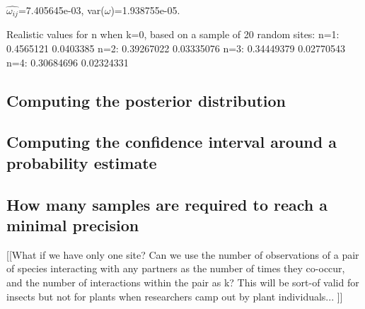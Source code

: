 \documentclass[12pt]{article}
\begin{document}
      $\hat{\omega_{ij}}$=7.405645e-03, var($\omega$)=1.938755e-05.
      

      Realistic values for n when k=0, based on a sample of 20 random sites:
      n=1: 0.4565121 0.0403385
      n=2: 0.39267022 0.03335076
      n=3: 0.34449379 0.02770543
      n=4: 0.30684696 0.02324331






    \subsection*{Computing the posterior distribution}

  \subsection*{Computing the confidence interval around a probability estimate}

    \subsection*{How many samples are required to reach a minimal precision}


  [[What if we have only one site? Can we use the number of observations of a pair of species interacting with any partners as the number of times they co-occur, and the number of interactions within the pair as k? This will be sort-of valid for insects but not for plants when researchers camp out by plant individuals... ]]


\clearpage

     
\end{document}

